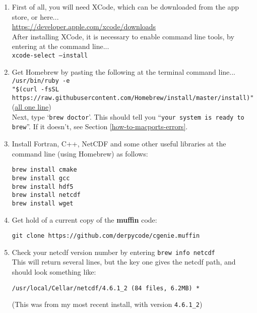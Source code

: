 \documentclass[11pt,fleqn]{book} %
\begin{document}
\begin{enumerate}

\item First of all, you will need XCode, which can be downloaded from the app store, or here... 
\\\href{https://developer.apple.com/xcode/downloads}{https://developer.apple.com/xcode/downloads} \\After installing XCode, it is necessary to enable command line tools, by entering at the command line...\\
\texttt{xcode-select --install} 

\item Get Homebrew by pasting the following at the terminal command line...
\\ \texttt{/usr/bin/ruby -e 
\small
\\"\$(curl -fsSL https://raw.githubusercontent.com/Homebrew/install/master/install)"
\normalsize}
(\uline{all one line})
\\Next, type `\texttt{brew doctor}'. This should tell you ``\texttt{your system is ready to brew}''. If it doesn't, see Section \ref{how-to-macports-errors}. 
\item Install Fortran, C++, NetCDF and some other useful libraries at the command line (using Homebrew) as follows:

\vspace{-5pt}\begin{verbatim}
brew install cmake
brew install gcc
brew install hdf5
brew install netcdf
brew install wget
\end{verbatim}

\item Get hold of a current copy of the \textbf{muffin} code:

\begin{verbatim}
git clone https://github.com/derpycode/cgenie.muffin
\end{verbatim}

\item Check your netcdf version number by entering \texttt{brew info netcdf}\\
This will return several lines, but the key one gives the netcdf path, and should look something like:
\vspace{-5pt}\begin{verbatim}
/usr/local/Cellar/netcdf/4.6.1_2 (84 files, 6.2MB) *
\end{verbatim}\vspace{-5pt}
(This was from my most recent install, with version \texttt{4.6.1\_2})


\end{enumerate}
\end{document}
